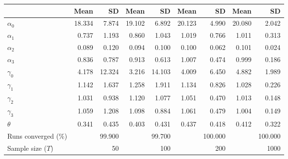 
\begin{tabular}[t]{lrrrrrrrr}
\toprule
  & Mean & SD & Mean  & SD  & Mean   & SD   & Mean    & SD   \\
\midrule
$\alpha_{0}$ & 18.334 & 7.874 & 19.102 & 6.892 & 20.123 & 4.990 & 20.080 & 2.042\\
$\alpha_{1}$ & 0.737 & 1.193 & 0.860 & 1.043 & 1.019 & 0.766 & 1.011 & 0.313\\
$\alpha_{2}$ & 0.089 & 0.120 & 0.094 & 0.100 & 0.100 & 0.062 & 0.101 & 0.024\\
$\alpha_{3}$ & 0.836 & 0.787 & 0.913 & 0.613 & 1.007 & 0.474 & 0.999 & 0.186\\
$\gamma_{0}$ & 4.178 & 12.324 & 3.216 & 14.103 & 4.009 & 6.450 & 4.882 & 1.989\\
$\gamma_{1}$ & 1.142 & 1.637 & 1.258 & 1.911 & 1.134 & 0.826 & 1.028 & 0.226\\
$\gamma_{2}$ & 1.031 & 0.938 & 1.120 & 1.077 & 1.051 & 0.470 & 1.013 & 0.148\\
$\gamma_{3}$ & 1.059 & 1.208 & 1.098 & 0.884 & 1.061 & 0.479 & 1.004 & 0.149\\
$\theta$ & 0.341 & 0.435 & 0.403 & 0.431 & 0.437 & 0.418 & 0.412 & 0.322\\
Runs converged (\%) &  & 99.900 &  & 99.700 &  & 100.000 &  & 100.000\\
Sample size ($T$) &  & 50 &  & 100 &  & 200 &  & 1000\\
\bottomrule
\end{tabular}
